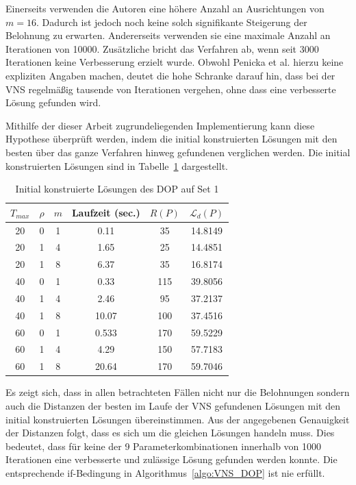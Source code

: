 \documentclass[12pt,a4paper,twoside]{article}
\theoremstyle{definition}
\numberwithin{equation}{section}
\begin{document}
Einerseits verwenden die Autoren eine höhere Anzahl an Ausrichtungen von $m = 16$. Dadurch ist jedoch noch keine solch signifikante Steigerung der Belohnung zu erwarten.
Andererseits verwenden sie eine maximale Anzahl an Iterationen von 10000. Zusätzliche bricht das Verfahren ab, wenn seit 3000 Iterationen keine Verbesserung erzielt wurde. Obwohl Penicka et al. hierzu keine expliziten Angaben machen, deutet die hohe Schranke darauf hin, dass bei der VNS regelmäßig tausende von Iterationen vergehen, ohne dass eine verbesserte Lösung gefunden wird.

Mithilfe der dieser Arbeit zugrundeliegenden Implementierung kann diese Hypothese überprüft werden, indem die initial konstruierten Lösungen mit den besten über das ganze Verfahren hinweg gefundenen verglichen werden. Die initial konstruierten Lösungen sind in Tabelle~\ref{tab:Results_Parametervariation_Initial} dargestellt.

\begin{table}[h]
	\centering
	\begin{tabular}{ |c|c|c|c|c|c| }
		\hline
		$T_{max}$ & $\rho$ & $m$ &  Laufzeit (sec.) & $R(P)$ & $\mathcal{L}_d(P)$ \\
		\hline  
		20 & 0 & 1  & 0.11
		& 35 & 14.8149\\
		20 & 1 & 4  & 1.65
		& 25 & 14.4851 \\
		20 & 1 & 8  & 6.37
		& 35 & 16.8174\\ 
		40 & 0 & 1  & 0.33
		& 115 & 39.8056
		\\
		40 & 1 & 4 & 2.46
		& 95 & 37.2137
		\\
		40 & 1 & 8  & 10.07
		& 100 & 37.4516
		\\
		60 & 0 & 1  & 0.533
		& 170 & 59.5229
		\\
		60 & 1 & 4  & 4.29
		& 150 & 57.7183
		\\
		60 & 1 & 8  & 20.64
		& 170 & 59.7046
		\\
		\hline
	\end{tabular}
	\caption{Initial konstruierte Lösungen des DOP auf Set 1}
	\label{tab:Results_Parametervariation_Initial}
\end{table}

Es zeigt sich, dass in allen betrachteten Fällen nicht nur die Belohnungen sondern auch die Distanzen der besten im Laufe der VNS gefundenen Lösungen mit den initial konstruierten Lösungen übereinstimmen. Aus der angegebenen Genauigkeit der Distanzen folgt, dass es sich um die gleichen Lösungen handeln muss. Dies bedeutet, dass für keine der 9 Parameterkombinationen innerhalb von 1000 Iterationen eine verbesserte und zulässige Lösung gefunden werden konnte.
Die entsprechende if-Bedingung in Algorithmus~\ref{algo:VNS_DOP} ist nie erfüllt.
\end{document}
